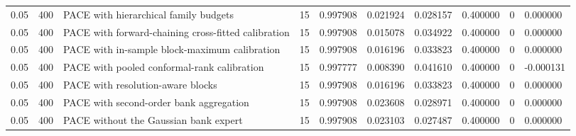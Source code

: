 \begin{tabular}{llllllllll}
0.05 & 400 & PACE with hierarchical family budgets & 15 & 0.997908 & 0.021924 & 0.028157 & 0.400000 & 0 & 0.000000 \\
0.05 & 400 & PACE with forward-chaining cross-fitted calibration & 15 & 0.997908 & 0.015078 & 0.034922 & 0.400000 & 0 & 0.000000 \\
0.05 & 400 & PACE with in-sample block-maximum calibration & 15 & 0.997908 & 0.016196 & 0.033823 & 0.400000 & 0 & 0.000000 \\
0.05 & 400 & PACE with pooled conformal-rank calibration & 15 & 0.997777 & 0.008390 & 0.041610 & 0.400000 & 0 & -0.000131 \\
0.05 & 400 & PACE with resolution-aware blocks & 15 & 0.997908 & 0.016196 & 0.033823 & 0.400000 & 0 & 0.000000 \\
0.05 & 400 & PACE with second-order bank aggregation & 15 & 0.997908 & 0.023608 & 0.028971 & 0.400000 & 0 & 0.000000 \\
0.05 & 400 & PACE without the Gaussian bank expert & 15 & 0.997908 & 0.023103 & 0.027487 & 0.400000 & 0 & 0.000000 \\
\bottomrule
\end{tabular}
